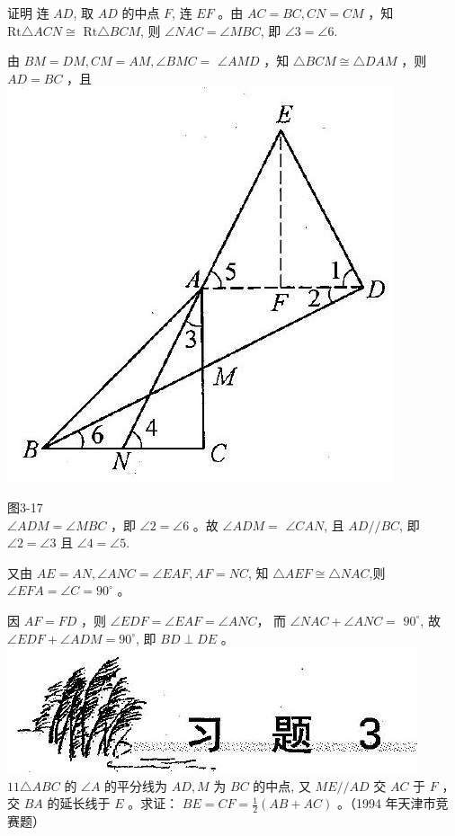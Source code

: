 \documentclass[10pt]{article}
\begin{document}
证明 连 $A D$, 取 $A D$ 的中点 $F$, 连 $E F$ 。由 $A C=B C, C N=C M$ ，知 $\mathrm{Rt} \triangle A C N \cong$ $\mathrm{Rt} \triangle B C M$, 则 $\angle N A C=\angle M B C$, 即 $\angle 3=\angle 6$.

由 $B M=D M, C M=A M, \angle B M C=$ $\angle A M D$ ，知 $\triangle B C M \cong \triangle D A M$ ，则 $A D=B C$ ，且\\
\includegraphics[max width=\textwidth, center]{2024_10_30_2c8f45efd4a519b08e1ag-034}

图3-17\\
$\angle A D M=\angle M B C$ ，即 $\angle 2=\angle 6$ 。故 $\angle A D M=$ $\angle C A N$, 且 $A D / / B C$, 即 $\angle 2=\angle 3$ 且 $\angle 4=\angle 5$.

又由 $A E=A N, \angle A N C=\angle E A F, A F=N C$, 知 $\triangle A E F \cong \triangle N A C$,则 $\angle E F A=\angle C=90^{\circ}$ 。

因 $A F=F D$ ，则 $\angle E D F=\angle E A F=\angle A N C ，$ 而 $\angle N A C+\angle A N C=$ $90^{\circ}$, 故 $\angle E D F+\angle A D M=90^{\circ}$, 即 $B D \perp D E$ 。\\
\includegraphics[max width=\textwidth, center]{2024_10_30_2c8f45efd4a519b08e1ag-034(1)}\\
$11 \triangle A B C$ 的 $\angle A$ 的平分线为 $A D, M$ 为 $B C$ 的中点, 又 $M E / / A D$ 交 $A C$ 于 $F$ ，交 $B A$ 的延长线于 $E$ 。求证： $B E=C F=\frac{1}{2}(A B+A C)$ 。（1994 年天津市竞赛题）
\end{document}
